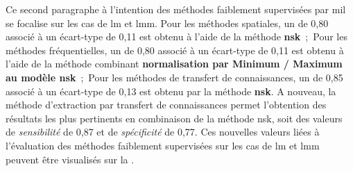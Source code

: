Ce second paragraphe à l'intention des méthodes faiblement supervisées par \gls{mil} se focalise sur les cas de \gls{lm} et \gls{lmm}. Pour les méthodes spatiales, un \fscore{} de 0,80 associé à un écart-type de 0,11 est obtenu à l'aide de la méthode \textbf{\gls{nsk}}~;~Pour les méthodes fréquentielles, un \fscore{} de 0,80 associé à un écart-type de 0,11 est obtenu à l'aide de la méthode combinant \textbf{normalisation par Minimum / Maximum au modèle \gls{nsk}}~;~Pour les méthodes de transfert de connaissances, un \fscore{} de 0,85 associé à un écart-type de 0,13 est obtenu par la méthode \textbf{\gls{nsk}}. A nouveau, la méthode d'extraction par transfert de connaissances permet l'obtention des résultats les plus pertinents en combinaison de la méthode \gls{nsk}, soit des valeurs de \textit{sensibilité} de 0,87 et de \textit{spécificité} de 0,77. Ces nouvelles valeurs liées à l'évaluation des méthodes faiblement supervisées sur les cas de \gls{lm} et \gls{lmm} peuvent être visualisés sur la .\par

